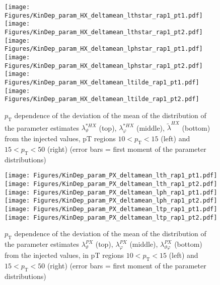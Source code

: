 \documentclass[12pt]{article}
\newcommand{\pT}{p_\mathrm{T}}
\newcommand{\lamtildeHX}{\tilde{\lambda}^{\scriptscriptstyle HX}}
\newcommand{\lamthstarHX}{\lambda^{* \scriptscriptstyle HX}_\vartheta}
\newcommand{\lamphstarHX}{\lambda^{* \scriptscriptstyle HX}_\varphi}
\newcommand{\lamthPX}{\lambda^{\scriptscriptstyle PX}_\vartheta}
\newcommand{\lamphPX}{\lambda^{\scriptscriptstyle PX}_\varphi}
\newcommand{\lamthphPX}{\lambda^{\scriptscriptstyle PX}_{\vartheta \varphi}}
\begin{document}
\begin{figure}[htbp]
\centering
\texttt{[image: Figures/KinDep\_param\_HX\_deltamean\_lthstar\_rap1\_pt1.pdf]}
\texttt{[image: Figures/KinDep\_param\_HX\_deltamean\_lthstar\_rap1\_pt2.pdf]}
\texttt{[image: Figures/KinDep\_param\_HX\_deltamean\_lphstar\_rap1\_pt1.pdf]}
\texttt{[image: Figures/KinDep\_param\_HX\_deltamean\_lphstar\_rap1\_pt2.pdf]}
\texttt{[image: Figures/KinDep\_param\_HX\_deltamean\_ltilde\_rap1\_pt1.pdf]}
\texttt{[image: Figures/KinDep\_param\_HX\_deltamean\_ltilde\_rap1\_pt2.pdf]}
\caption{$\pT$ dependence of the deviation of the mean of the distribution of
the parameter estimates $\lamthstarHX$ (top), $\lamphstarHX$ (middle),
$\lamtildeHX$ (bottom) from the injected values, pT regions $10<\pT<15$ (left) and $15<\pT<50$ (right) (error bars = first moment of
the parameter distributions)}
\end{figure}
\clearpage











\begin{figure}[htbp]
\centering
\texttt{[image: Figures/KinDep\_param\_PX\_deltamean\_lth\_rap1\_pt1.pdf]}
\texttt{[image: Figures/KinDep\_param\_PX\_deltamean\_lth\_rap1\_pt2.pdf]}
\texttt{[image: Figures/KinDep\_param\_PX\_deltamean\_lph\_rap1\_pt1.pdf]}
\texttt{[image: Figures/KinDep\_param\_PX\_deltamean\_lph\_rap1\_pt2.pdf]}
\texttt{[image: Figures/KinDep\_param\_PX\_deltamean\_ltp\_rap1\_pt1.pdf]}
\texttt{[image: Figures/KinDep\_param\_PX\_deltamean\_ltp\_rap1\_pt2.pdf]}
\caption{$\pT$ dependence of the deviation of the mean of the distribution of
the parameter estimates $\lamthPX$ (top), $\lamphPX$ (middle), $\lamthphPX$
(bottom) from the injected values, in pT regions $10<\pT<15$ (left) and $15<\pT<50$ (right) (error bars = first moment of the parameter
distributions)}
\end{figure}
\clearpage
\end{document}
